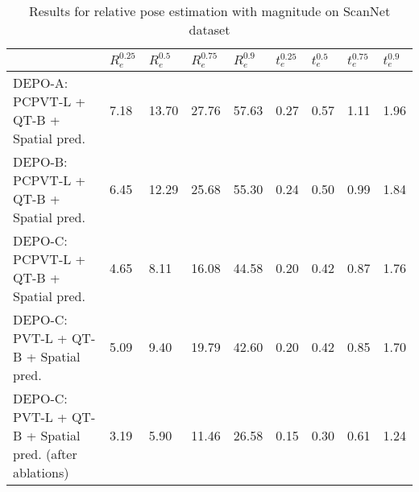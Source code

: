 \begin{table}[h!]
\centering
\caption{Results for relative pose estimation with magnitude on ScanNet dataset}
\label{tab:scannet_abs}
\begin{tabular}{lllllllll}
\toprule
 & $R_e^0.25$ & $R_e^0.5$ & $R_e^0.75$ & $R_e^0.9$ & $t_e^0.25$ & $t_e^0.5$ & $t_e^0.75$ & $t_e^0.9$ \\
\midrule
DEPO-A: PCPVT-L + QT-B + Spatial pred. & {\cellcolor[HTML]{A50026}} \color[HTML]{F1F1F1} 7.18 & {\cellcolor[HTML]{A50026}} \color[HTML]{F1F1F1} 13.70 & {\cellcolor[HTML]{A50026}} \color[HTML]{F1F1F1} 27.76 & {\cellcolor[HTML]{A50026}} \color[HTML]{F1F1F1} 57.63 & {\cellcolor[HTML]{A50026}} \color[HTML]{F1F1F1} 0.27 & {\cellcolor[HTML]{A50026}} \color[HTML]{F1F1F1} 0.57 & {\cellcolor[HTML]{A50026}} \color[HTML]{F1F1F1} 1.11 & {\cellcolor[HTML]{A50026}} \color[HTML]{F1F1F1} 1.96 \\
DEPO-B: PCPVT-L + QT-B + Spatial pred. & {\cellcolor[HTML]{E34933}} \color[HTML]{F1F1F1} 6.45 & {\cellcolor[HTML]{E24731}} \color[HTML]{F1F1F1} 12.29 & {\cellcolor[HTML]{D62F27}} \color[HTML]{F1F1F1} 25.68 & {\cellcolor[HTML]{BE1827}} \color[HTML]{F1F1F1} 55.30 & {\cellcolor[HTML]{E65036}} \color[HTML]{F1F1F1} 0.24 & {\cellcolor[HTML]{F57245}} \color[HTML]{F1F1F1} 0.50 & {\cellcolor[HTML]{EB5A3A}} \color[HTML]{F1F1F1} 0.99 & {\cellcolor[HTML]{E14430}} \color[HTML]{F1F1F1} 1.84 \\
DEPO-C: PCPVT-L + QT-B + Spatial pred. & {\cellcolor[HTML]{FFFCBA}} \color[HTML]{000000} 4.65 & {\cellcolor[HTML]{EBF7A3}} \color[HTML]{000000} 8.11 & {\cellcolor[HTML]{EBF7A3}} \color[HTML]{000000} 16.08 & {\cellcolor[HTML]{FCAA5F}} \color[HTML]{000000} 44.58 & {\cellcolor[HTML]{FEE797}} \color[HTML]{000000} 0.20 & {\cellcolor[HTML]{FEEA9B}} \color[HTML]{000000} 0.42 & {\cellcolor[HTML]{FECC7B}} \color[HTML]{000000} 0.87 & {\cellcolor[HTML]{F57547}} \color[HTML]{F1F1F1} 1.76 \\
DEPO-C: PVT-L + QT-B + Spatial pred. & {\cellcolor[HTML]{FEE18D}} \color[HTML]{000000} 5.09 & {\cellcolor[HTML]{FEE797}} \color[HTML]{000000} 9.40 & {\cellcolor[HTML]{FED481}} \color[HTML]{000000} 19.79 & {\cellcolor[HTML]{FDC372}} \color[HTML]{000000} 42.60 & {\cellcolor[HTML]{FEEC9F}} \color[HTML]{000000} 0.20 & {\cellcolor[HTML]{FEE797}} \color[HTML]{000000} 0.42 & {\cellcolor[HTML]{FEDA86}} \color[HTML]{000000} 0.85 & {\cellcolor[HTML]{FA9B58}} \color[HTML]{000000} 1.70 \\
DEPO-C: PVT-L + QT-B + Spatial pred. (after ablations) & {\cellcolor[HTML]{75C465}} \color[HTML]{000000} 3.19 & {\cellcolor[HTML]{78C565}} \color[HTML]{000000} 5.90 & {\cellcolor[HTML]{75C465}} \color[HTML]{000000} 11.46 & {\cellcolor[HTML]{A5D86A}} \color[HTML]{000000} 26.58 & {\cellcolor[HTML]{96D268}} \color[HTML]{000000} 0.15 & {\cellcolor[HTML]{7FC866}} \color[HTML]{000000} 0.30 & {\cellcolor[HTML]{91D068}} \color[HTML]{000000} 0.61 & {\cellcolor[HTML]{7FC866}} \color[HTML]{000000} 1.24 \\

\end{tabular}
\end{table}
